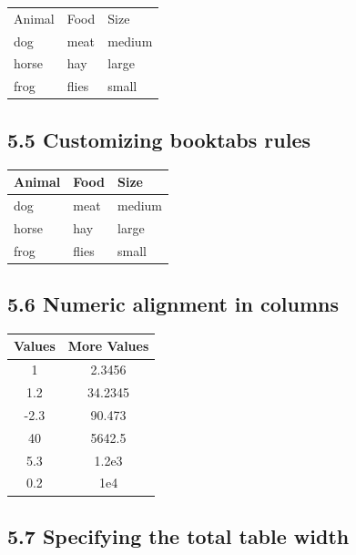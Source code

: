 \documentclass{article}
\begin{document}
\vspace{2em}



 \begin{tabular}{l|ll}
 Animal & Food & Size \\[2pt]
 dog & meat & medium \\
 horse & hay & large \\
 frog & flies & small \\
 \end{tabular}

\subsection*{ 5.5 Customizing booktabs rules}

 \begin{tabular}{@{} lll@{}} \toprule[2pt]
 Animal & Food & Size \\ \midrule[1pt]
 dog & meat & medium \\
 \cmidrule[0.5pt](r{1pt}l{1cm}){1-2}
 horse & hay & large \\
 frog & flies & small \\ \bottomrule[2pt]
 \end{tabular}

\subsection*{ 5.6 Numeric alignment in columns}

 \begin{tabular}{SS}
 \toprule
 {Values} & {More Values} \\
  	&  2.3456 \\
 1.2 	&  34.2345 \\
-2.3 	& 90.473 \\
 40 	& 5642.5 \\
 5.3 	& 1.2e3 \\
 0.2 	& 1e4 \\

 \bottomrule
 \end{tabular}

\subsection*{ 5.7 Specifying the total table width}
\end{document}
